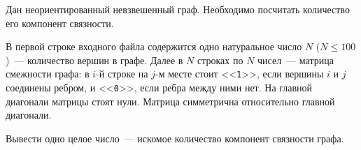 

Дан неориентированный невзвешенный граф. Необходимо посчитать количество его компонент связности.

\InputFile
В первой строке входного файла содержится одно натуральное число $N$
(${N \leqslant 100}$)~--- количество вершин в графе.
Далее в $N$ строках по $N$ чисел~--- матрица смежности графа:
в $i$-й строке на $j$-м месте стоит <<\texttt{1}>>,
если вершины $i$ и $j$ соединены ребром, и <<\texttt{0}>>,
если ребра между ними нет. На главной диагонали матрицы стоят нули.
Матрица симметрична относительно главной диагонали.

\OutputFile
Вывести одно целое число~--- искомое количество компонент связности графа.


